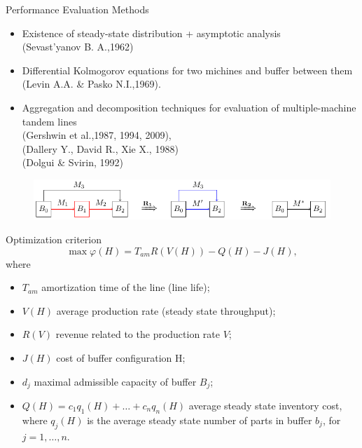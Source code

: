 \documentclass[aspectratio=169,xcolor=dvipsnames]{beamer}
\begin{document}

\begin{frame}{Performance Evaluation Methods}
    \begin{itemize}
	\item Existence of steady-state distribution + asymptotic analysis\\
	(Sevast'yanov B. A.,1962)
	\item Differential Kolmogorov equations for two michines and buffer between them \\
	(Levin A.A. \& Pasko N.I.,1969).
	\item Aggregation and decomposition techniques for evaluation of multiple-machine tandem lines\\
	(Gershwin et al.,1987, 1994, 2009),\\
	(Dallery Y., David R., Xie X., 1988)\\
	(Dolgui \& Svirin, 1992)\\
    \end{itemize}
    \begin{figure}
    \includegraphics[scale=0.8]{alg_line}
    \end{figure}
\end{frame}


\begin{frame}{Optimization criterion}
\begin{equation}
\label{criteria}
\max \varphi(H)=T_{am} R(V(H)) - Q(H) - J(H),
\end{equation}
where 
\begin{itemize}
\item $T_{am}$  amortization time of the line (line life); 
\item $V(H)$  average production rate (steady state throughput); 
\item $R(V)$  revenue related to the production rate $V$; 
\item $J(H)$ cost of buffer configuration H; 
\item $d_j$ maximal admissible capacity of buffer $B_j$;
\item $Q(H)= c_1q_1(H)+ …+c_n q_n(H)$ average steady state inventory cost, where $q_j(H)$ is the average steady state number of parts in buffer $b_j$, for $j=1,…,n$.
\end{itemize}
\end{frame}
\end{document}
